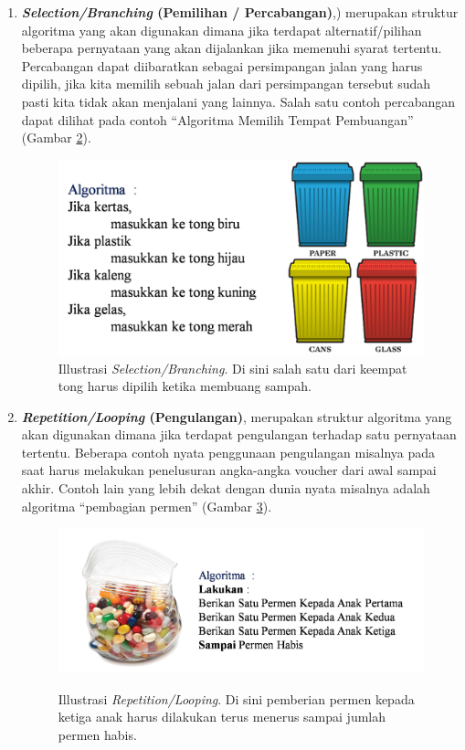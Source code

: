 \begin{enumerate}
\begin{figure}
		\caption{Illustrasi \textit{sequence}. Ada 3 \textit{statement} di dalam  1 \textit{sequence}untuk memindahkan isi dari kedua gelas.}
		\label{fig:illustrasiSequence}
	\end{figure}
	\FloatBarrier
	\item \textbf{\textit{Selection/Branching} (Pemilihan / Percabangan)},) merupakan struktur algoritma yang akan digunakan dimana jika terdapat alternatif/pilihan beberapa pernyataan yang akan dijalankan jika memenuhi syarat tertentu. Percabangan dapat diibaratkan sebagai persimpangan jalan yang harus dipilih, jika kita memilih sebuah jalan dari persimpangan tersebut sudah pasti kita tidak akan menjalani yang lainnya. Salah satu contoh percabangan dapat dilihat pada contoh ``Algoritma Memilih Tempat Pembuangan'' (Gambar \ref{fig:illustrasiBranching}).
		\begin{figure}
			\centering
			\includegraphics[scale=0.4]{fig/1/Gambar14.png}	
			\caption{Illustrasi \textit{Selection/Branching}. Di sini salah satu dari keempat tong harus dipilih ketika membuang sampah.}
			\label{fig:illustrasiBranching}
		\end{figure}
	\FloatBarrier
	\item \textbf{\textit{Repetition/Looping} (Pengulangan)}, merupakan struktur algoritma yang akan digunakan dimana jika terdapat pengulangan terhadap satu pernyataan tertentu. Beberapa contoh nyata penggunaan pengulangan misalnya pada saat harus melakukan penelusuran angka-angka voucher dari awal sampai akhir. Contoh lain yang lebih dekat dengan dunia nyata misalnya adalah algoritma ``pembagian permen'' (Gambar \ref{fig:illustrasiLoop}).
		\begin{figure}
		\centering
		\includegraphics[scale=0.4]{fig/1/Gambar15.png}	
		\label{fig:illustrasiLoop}
		\caption{Illustrasi \textit{Repetition/Looping}. Di sini pemberian permen kepada ketiga anak harus dilakukan terus menerus sampai jumlah permen habis.}
		\end{figure}
\end{enumerate}

